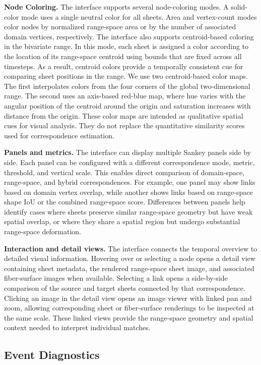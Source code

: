 \documentclass{vgtc}                          %
\newcommand{\myparagraph}[1]{\vspace{1mm} \noindent \textbf{#1}}
\begin{document}
\myparagraph{Node Coloring.} The interface supports several node-coloring modes. A solid-color mode uses a single neutral color for all sheets. Area and vertex-count modes color nodes by normalized range-space area or by the number of associated domain vertices, respectively. The interface also supports centroid-based coloring in the bivariate range. In this mode, each sheet is assigned a color according to the location of its range-space centroid using bounds that are fixed across all timesteps. As a result, centroid colors provide a temporally consistent cue for comparing sheet positions in the range. We use two centroid-based color maps. The first interpolates colors from the four corners of the global two-dimensional range. The second uses an axis-based red-blue map, where hue varies with the angular position of the centroid around the origin and saturation increases with distance from the origin. These color maps are intended as qualitative spatial cues for visual analysis. They do not replace the quantitative similarity scores used for correspondence estimation.


\myparagraph{Panels and metrics.} The interface can display multiple Sankey panels side by side. Each panel can be configured with a different correspondence mode, metric, threshold, and vertical scale. This enables direct comparison of domain-space, range-space, and hybrid correspondences. For example, one panel may show links based on domain vertex overlap, while another shows links based on range-space shape IoU or the combined range-space score. Differences between panels help identify cases where sheets preserve similar range-space geometry but have weak spatial overlap, or where they share a spatial region but undergo substantial range-space deformation.


\myparagraph{Interaction and detail views.} The interface connects the temporal overview to detailed visual information. Hovering over or selecting a node opens a detail view containing sheet metadata, the rendered range-space sheet image, and associated fiber-surface images when available. Selecting a link opens a side-by-side comparison of the source and target sheets connected by that correspondence. Clicking an image in the detail view opens an image viewer with linked pan and zoom, allowing corresponding sheet or fiber-surface renderings to be inspected at the same scale. These linked views provide the range-space geometry and spatial context needed to interpret individual matches.

\subsection{Event Diagnostics}
\end{document}

